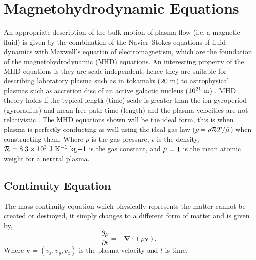 \documentclass[12pt]{ociamthesis}
\newcommand{\bs}[1]{\boldsymbol{#1}}
\newcommand{\bn}{\boldsymbol{\nabla}}
\newcommand{\rgas}{\mathcal{R}}
\begin{document}
\section{Magnetohydrodynamic Equations}
\label{section:MHD_eqs}
An appropriate description of the bulk motion of plasma flow (i.e. a magnetic fluid) is given by the combination of the Navier–Stokes equations of fluid dynamics with Maxwell's equation of electromagnetism, which are the foundation of the magnetohydrodynamic (MHD) equations. An interesting property of the MHD equations is they are scale independent, hence they are suitable for describing laboratory plasma such as in tokamaks ($20~\rm{m}$) to astrophysical plasmas such as accretion disc of an active galactic nucleus ($10^{21}~\rm{m}$) \citep{goedbloed2004principles}. MHD theory holds if the typical length (time) scale is greater than the ion gyroperiod (gyroradius) and mean free path time (length) and the plasma velocities are not relativistic \citep{priest2014magnetohydrodynamics}. The MHD equations shown will be the ideal form, this is when plasma is perfectly conducting as well using the ideal gas law ($p = \rho \rgas T/\Tilde{\mu}$) when constructing them. Where $p$ is the gas pressure, $\rho$ is the density, $\rgas=8.3\times 10^{3}~\rm{J~K^{-1}~kg{-1}}$ is the gas constant, and $\Tilde{\mu}=1$ is the mean atomic weight for a neutral plasma.    
\subsection{Continuity Equation}
\label{section:cont_eq}
The mass continuity equation which physically represents the matter cannot be created or destroyed, it simply changes to a different form of matter and is given by,
\begin{equation}\label{eq86}
\frac{\partial \rho}{\partial t} = - \bn \cdot (\rho \boldsymbol{v}).
\end{equation}
Where $\bs{v}=(v_x,v_y,v_z)$ is the plasma velocity and $t$ is time. 
\end{document}
